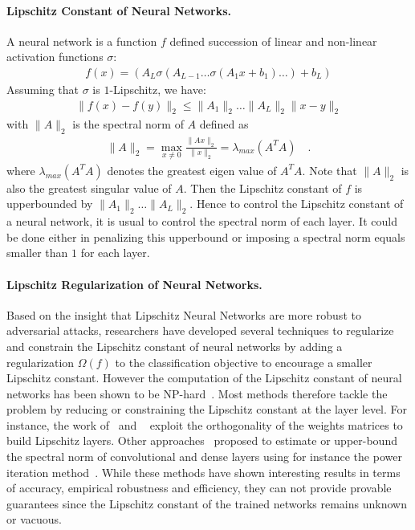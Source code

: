 \paragraph{Lipschitz Constant of Neural Networks.}  A neural network is a function $f$ defined succession of linear and non-linear activation functions $\sigma$:
\begin{align*}
  f(x) = \left(A_L\sigma\left(A_{L-1}\dots \sigma\left(A_1x+b_1\right)\dots\right)+b_L\right)
\end{align*}
Assuming that $\sigma$ is $1$-Lipschitz, we have:
\begin{align*}
  \lVert f(x)-f(y)\rVert_2\leq \lVert A_1\rVert_2\dots \lVert A_L\rVert_2\lVert x-y\rVert_2
\end{align*}
with $\lVert A\rVert_2$ is the spectral norm of $A$ defined as
\begin{align*}
  \lVert A\rVert_2 = \max_{x\neq 0} \frac{\lVert Ax\rVert_2}{\lVert x\rVert_2} = \lambda_{max}(A^TA)\quad.
\end{align*}
where $\lambda_{max}(A^TA)$ denotes the greatest eigen value of $A^TA$. Note that $\lVert A\rVert_2$ is also the greatest singular value of $A$.  
Then the Lipschitz constant of $f$ is upperbounded by $\lVert A_1\rVert_2\dots \lVert A_L\rVert_2$. Hence to control the Lipschitz constant of a neural network, it is usual to control the spectral norm of each layer. It could be done either in penalizing this upperbound or imposing a spectral norm equals smaller than $1$ for each layer. 

\paragraph{Lipschitz Regularization of Neural Networks.}  Based on the insight that Lipschitz Neural Networks are more robust to adversarial attacks, researchers have developed several techniques to regularize and constrain the Lipschitz constant of neural networks by adding a regularization $\Omega(f)$ to the classification objective to encourage a smaller Lipschitz constant.
However the computation of the Lipschitz constant of neural networks has been shown to be NP-hard~\citep{scaman2018lipschitz}.  Most methods therefore tackle the problem by reducing or constraining the Lipschitz constant at the layer level.
For instance, the work of~\citet{cisse2017parseval,huang2020controllable} and ~\citet{wang2020orthogonal} exploit the orthogonality of the weights matrices to build Lipschitz layers.
Other approaches~\citep{gouk2021regularisation,jia2017improving,sedghi2018singular,singla2021fantastic,araujo2021lipschitz} proposed to estimate or upper-bound the spectral norm of convolutional and dense layers using for instance the power iteration method~\citep{golub2000eigenvalue}.
While these methods have shown interesting results in terms of accuracy, empirical robustness and efficiency, they can not provide provable guarantees since the Lipschitz constant of the trained networks remains unknown or vacuous.



